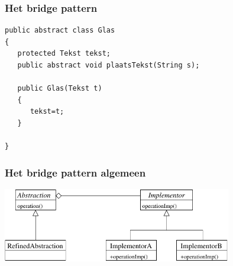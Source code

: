 \documentclass{beamer}
\begin{document}
\begin{frame}[fragile]
\frametitle{Het bridge pattern}
\begin{verbatim}
public abstract class Glas
{
   protected Tekst tekst;
   public abstract void plaatsTekst(String s);

   public Glas(Tekst t)
   {
      tekst=t;
   }

}
\end{verbatim}
\end{frame}

\begin{frame}
\frametitle{Het bridge pattern algemeen}
\begin{center}
\includegraphics[width=10cm]{bridge7}
\end{center}
\end{frame}
\end{document}
